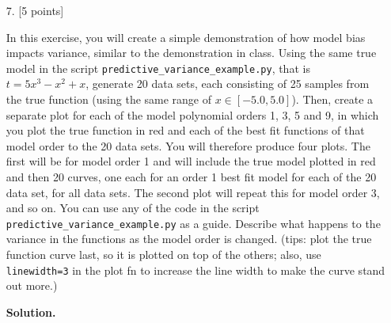 \documentclass[10pt]{article}
\begin{document}
\begin{itemize}
\clearpage
\item[7.] [5 points]

In this exercise, you will create a simple demonstration of how model bias impacts variance, similar to the demonstration in class.  Using the same true model in the script {\tt predictive\_variance\_example.py}, that is $t = 5x^3-x^2+x$, generate 20 data sets, each consisting of 25 samples from the true function (using the same range of $x \in [-5.0,5.0]$).  Then, create a separate plot for each of the model polynomial orders 1, 3, 5 and 9, in which you plot the true function in red and each of the best fit functions of that model order to the 20 data sets.  You will therefore produce four plots.  The first will be for model order 1 and will include the true model plotted in red and then 20 curves, one each for an order 1 best fit model for each of the 20 data set, for all data sets.  The second plot will repeat this for model order 3, and so on.  You can use any of the code in the script {\tt predictive\_variance\_example.py} as a guide.  Describe what happens to the variance in the functions as the model order is changed.  (tips: plot the true function curve last, so it is plotted on top of the others; also, use {\tt linewidth=3} in the plot fn to increase the line width to make the curve stand out more.)

{\bf Solution.}

\begin{figure}[htb]
\begin{center}


\end{center}
\end{figure}
\end{itemize}
\end{document}
